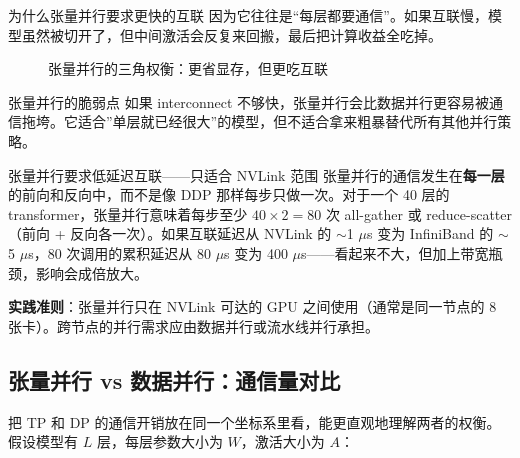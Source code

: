 \documentclass[a4paper]{article}
\begin{document}
\begin{importantbox}{为什么张量并行要求更快的互联}
因为它往往是“每层都要通信”。如果互联慢，模型虽然被切开了，但中间激活会反复来回搬，最后把计算收益全吃掉。
\end{importantbox}

\begin{figure}[H]
\centering
{}
\caption{张量并行的三角权衡：更省显存，但更吃互联}
\end{figure}

\begin{warningbox}{张量并行的脆弱点}
如果 interconnect 不够快，张量并行会比数据并行更容易被通信拖垮。它适合”单层就已经很大”的模型，但不适合拿来粗暴替代所有其他并行策略。
\end{warningbox}

\begin{warningbox}{张量并行要求低延迟互联——只适合 NVLink 范围}
张量并行的通信发生在\textbf{每一层}的前向和反向中，而不是像 DDP 那样每步只做一次。对于一个 40 层的 transformer，张量并行意味着每步至少 $40 \times 2 = 80$ 次 all-gather 或 reduce-scatter（前向 + 反向各一次）。如果互联延迟从 NVLink 的 $\sim$1 $\mu$s 变为 InfiniBand 的 $\sim$5 $\mu$s，80 次调用的累积延迟从 80 $\mu$s 变为 400 $\mu$s——看起来不大，但加上带宽瓶颈，影响会成倍放大。

\textbf{实践准则}：张量并行只在 NVLink 可达的 GPU 之间使用（通常是同一节点的 8 张卡）。跨节点的并行需求应由数据并行或流水线并行承担。
\end{warningbox}

\subsection{张量并行 vs 数据并行：通信量对比}

把 TP 和 DP 的通信开销放在同一个坐标系里看，能更直观地理解两者的权衡。假设模型有 $L$ 层，每层参数大小为 $W$，激活大小为 $A$：
\end{document}
